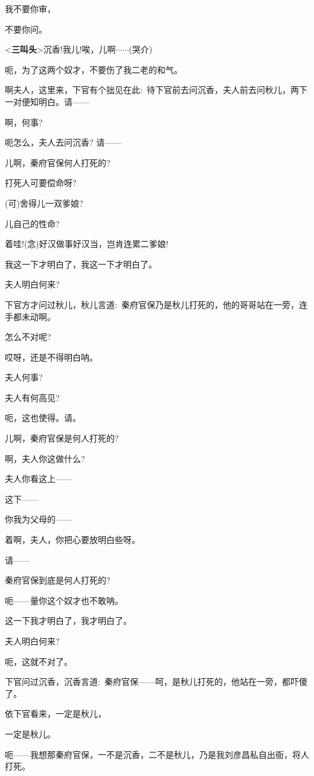 {我不要你审，}

{不要你问。}

{\textless{}{\!\bfseries\akai 三叫头}\!\textgreater{}沉香!我儿!唉，儿啊$\cdots{}\cdots{}$({\hwfs 哭介})}

{呃，为了这两个奴才，不要伤了我二老的和气。}

{啊夫人，这里来，下官有个拙见在此:~待下官前去问沉香，夫人前去问秋儿，两下一对便知明白。请------}

{啊，何事?}

{呃怎么，夫人去问沉香? 请------}

{儿啊，秦府官保何人打死的?}

{打死人可要偿命呀?}

{(可)舍得儿一双爹娘?}

{儿自己的性命?}

{着哇!({\akai 念})好汉做事好汉当，岂肯连累二爹娘!}

{我这一下才明白了，我这一下才明白了。}

{夫人明白何来?}

{下官方才问过秋儿，秋儿言道:~秦府官保乃是秋儿打死的，他的哥哥站在一旁，连手都未动啊。}

{怎么不对呢?}

{哎呀，还是不得明白{\footnotesize 呐}。}

{夫人何事?}

{夫人有何高见?}

{呃，这也使得。请。}

{儿啊，秦府官保是何人打死的?}

{啊，夫人你这做什么?}

{夫人你看这上------}

{这下------}

{你我为父母的------}

{着啊，夫人，你把心要放明白些{\footnotesize 呀}。}

{请------}

{秦府官保到底是何人打死的?}

{呃------量你这个奴才也不敢{\footnotesize 呐}。}

{这一下我才明白了，我才明白了。}

{夫人明白何来?}

{呃，这就不对了。}

{下官问过沉香，沉香言道:~秦府官保------呵，是秋儿打死的，他站在一旁，都吓傻了。}

{依下官看来，一定是秋儿，}

{一定是秋儿。}

{呃------我想那秦府官保，一不是沉香，二不是秋儿，乃是我刘彦昌私自出衙，将人打死。}


